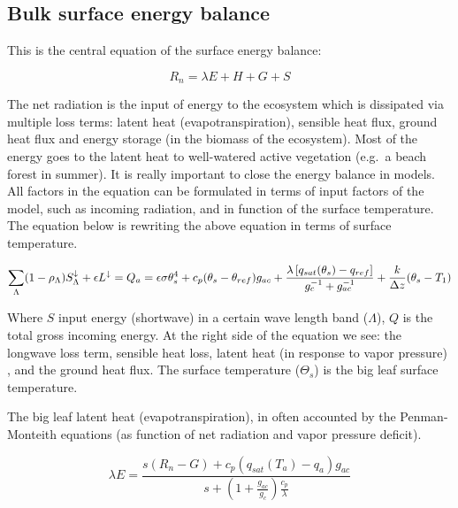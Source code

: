 \documentclass[12pt,oneside]{book}
\begin{document}
\subsection{Bulk surface energy
balance}\label{bulk-surface-energy-balance}

This is the central equation of the surface energy balance:

\[
R_n = \lambda E + H + G +S
\]

The net radiation is the input of energy to the ecosystem which is
dissipated via multiple loss terms: latent heat (evapotranspiration),
sensible heat flux, ground heat flux and energy storage (in the biomass
of the ecosystem). Most of the energy goes to the latent heat to
well-watered active vegetation (e.g.~a beach forest in summer). It is
really important to close the energy balance in models. All factors in
the equation can be formulated in terms of input factors of the model,
such as incoming radiation, and in function of the surface temperature.
The equation below is rewriting the above equation in terms of surface
temperature.

\[
\sum_{\Lambda} (1 - \rho_{\Lambda} ) S^{\downarrow}_{\Lambda} + \epsilon  L^{\downarrow} = Q_{a} \\ = \epsilon \sigma \theta_s^{4} + c_p ( \theta_s - \theta_{ref} ) g_{ac} + \frac{\lambda \left[ q_{sat} ( \theta_s ) - q_{ref} \right] }{ g_c^{-1} + g_{ac}^{-1}} + \frac{k}{\Delta z} (\theta_s - T_1)
\]

Where \(S\) input energy (shortwave) in a certain wave length band
(\(\Lambda\)), \(Q\) is the total gross incoming energy. At the right
side of the equation we see: the longwave loss term, sensible heat loss,
latent heat (in response to vapor pressure) , and the ground heat flux.
The surface temperature (\(\Theta_s\)) is the big leaf surface
temperature.

The big leaf latent heat (evapotranspiration), in often accounted by the
Penman-Monteith equations (as function of net radiation and vapor
pressure deficit).

\[
\lambda E = \frac{s (R_n - G) + c_p \left(q_{sat}(T_a) - q_a \right) g_{ac}}{s + (1 + \frac{g_{ac}}{g_c}) \frac{c_p}{\lambda}}
\]
\end{document}
